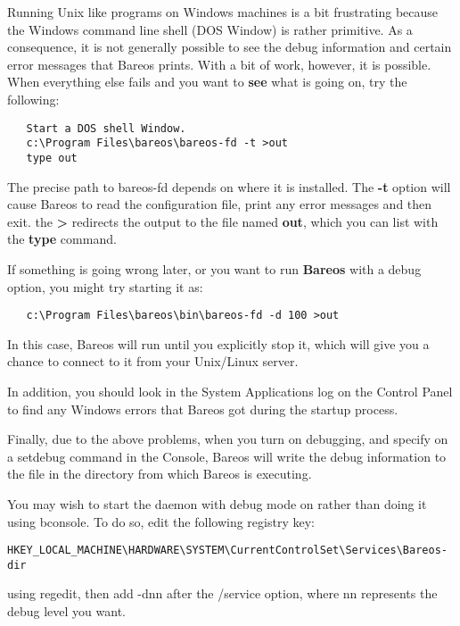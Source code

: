 Running Unix like programs on Windows machines is a bit frustrating because
the Windows command line shell (DOS Window) is rather primitive. As a
consequence, it is not generally possible to see the debug information and
certain error messages that Bareos prints. With a bit of work, however, it is
possible. When everything else fails and you want to {\bf see} what is going
on, try the following:

\footnotesize
\begin{verbatim}
   Start a DOS shell Window.
   c:\Program Files\bareos\bareos-fd -t >out
   type out
\end{verbatim}
\normalsize

The precise path to bareos-fd depends on where it is installed.
The {\bf -t} option will cause Bareos to read the configuration file, print
any error messages and then exit. the {\bf {\textgreater}} redirects the output to the
file named {\bf out}, which you can list with the {\bf type} command.

If something is going wrong later, or you want to run {\bf Bareos} with a
debug option, you might try starting it as:

\footnotesize
\begin{verbatim}
   c:\Program Files\bareos\bin\bareos-fd -d 100 >out
\end{verbatim}
\normalsize

In this case, Bareos will run until you explicitly stop it, which will give
you a chance to connect to it from your Unix/Linux server.

In addition, you should look in the System Applications log on the Control
Panel to find any Windows errors that Bareos got during the startup process.

Finally, due to the above problems, when you turn on debugging, and specify
 on a setdebug command in the Console, Bareos will write the debug
information to the file  in the directory from which Bareos
is executing.

You may wish to start the daemon with debug mode on rather than doing it
using bconsole. To do so, edit the following registry key:

\footnotesize
\begin{verbatim}
HKEY_LOCAL_MACHINE\HARDWARE\SYSTEM\CurrentControlSet\Services\Bareos-dir
\end{verbatim}
\normalsize

using regedit, then add -dnn after the /service option, where nn represents
the debug level you want.

